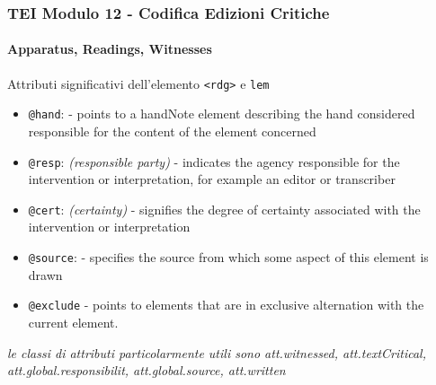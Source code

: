 \begin{frame}
    \frametitle{TEI Modulo 12 - Codifica Edizioni Critiche}
    \framesubtitle{Apparatus, Readings, Witnesses}
    \addtocounter{nframe}{1}

      
	
    \begin{block}{Attributi significativi dell'elemento \texttt{<rdg>} e \texttt{lem}}
        \begin{itemize}
            \item \texttt{@hand}: \textit{} - points to a handNote element describing the hand considered responsible for the content of the element concerned
            \item \texttt{@resp}: \textit{(responsible party)} - indicates the agency responsible for the intervention or interpretation, for example an editor or transcriber
            \item \texttt{@cert}: \textit{(certainty)} - signifies the degree of certainty associated with the intervention or interpretation
            \item \texttt{@source}: \textit{} - specifies the source from which some aspect of this element is drawn
            \item \texttt{@exclude}	\textit{} - points to elements that are in exclusive alternation with the current element.
        \end{itemize}
    \end{block}

    \textit{le classi di attributi particolarmente utili sono att.witnessed, att.textCritical, att.global.responsibilit, att.global.source, att.written}


\end{frame}


